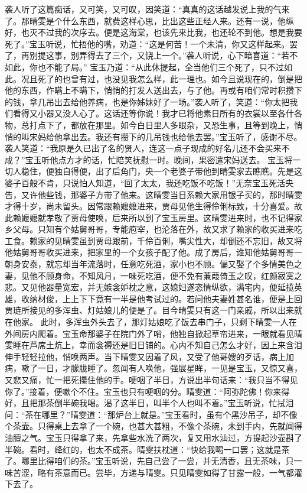 \documentclass[12pt,oneside]{book}
\begin{document}
袭人听了这篇痴话，又可笑，又可叹，因笑道：“真真的这话越发说上我的气来了。那晴雯是个什么东西，就费这样心思，比出这些正经人来。还有一说，他纵好，也灭不过我的次序去。便是这海棠，也该先来比我，也还轮不到他。想是我要死了。”宝玉听说，忙捂他的嘴，劝道：“这是何苦！一个未清，你又这样起来。罢了，再别提这事，别弄得去了三个，又饶上一个。”袭人听说，心下暗喜道：“若不如此，你也不能了局。”
宝玉乃道：“从此休提起，全当他们三个死了，只不过如此。况且死了的也曾有过，也没见我怎么样，此一理也。如今且说现在的，倒是把他的东西，作瞒上不瞒下，悄悄的打发人送出去，与了他。再或有咱们常时积攒下的钱，拿几吊出去给他养病，也是你姊妹好了一场。”袭人听了，笑道：“你太把我们看得又小器又没人心了。这话还等你说！我才已将他素日所有的衣裳以至各什各物，总打点下了，都放在那里。如今白日里人多眼杂，又恐生事，且等到晚上，悄悄的叫宋妈给他拿出去。我还有攒下的几吊钱也给他去罢。”宝玉听了，感谢不尽。袭人笑道：“我原是久已出了名的贤人，连这一点子现成的好名儿还不会买来不成？”宝玉听他点方才的话，忙陪笑抚慰一时。晚间，果密遣宋妈送去。
宝玉将一切人稳住，便独自得便，出了后角门，央一个老婆子带他到晴雯家去瞧瞧。先是这婆子百般不肯，只说怕人知道，“回了太太，我还吃饭不吃饭！”无奈宝玉死活央告，又许他些钱，那婆子方带了他来。这晴雯当日系赖大家用银子买的，那时晴雯才得十岁，尚未留头。因常跟赖嬷嬷进来，贾母见他生得伶俐标致，十分喜爱。故此赖嬷嬷就孝敬了贾母使唤，后来所以到了宝玉房里。这晴雯进来时，也不记得家乡父母。只知有个姑舅哥哥，专能庖宰，也沦落在外，故又求了赖家的收买进来吃工食。赖家的见晴雯虽到贾母跟前，千伶百俐，嘴尖性大，却倒还不忘旧，故又将他姑舅哥哥收买进来，把家里的一个女孩子配了他。成了房后，谁知他姑舅哥哥一朝身安泰，就忘却当年流落时，任意吃死酒，家小也不顾。偏又娶了个多情美色之妻，见他不顾身命，不知风月，一味死吃酒，便不免有蒹葭倚玉之叹，红颜寂寞之悲。又见他器量宽宏，并无嫉衾妒枕之意，这媳妇遂恣情纵欲，满宅内，便延揽英雄，收纳材俊，上上下下竟有一半是他考试过的。若问他夫妻姓甚名谁，便是上回贾琏所接见的多浑虫、灯姑娘儿的便是了。目今晴雯只有这一门亲戚，所以出来就在他家。
此时，多浑虫外头去了，那灯姑娘吃了饭去串门子，只剩下晴雯一人在外间房内爬着。宝玉命那婆子在院门外了哨，他独自掀起草帘进来，一眼就看见晴雯睡在芦席土炕上，幸而衾褥还是旧日铺的。心内不知自己怎么才好，因上来含泪伸手轻轻拉他，悄唤两声。当下晴雯又因着了风，又受了他哥嫂的歹话，病上加病，嗽了一日，才朦胧睡了。忽闻有人唤他，强展星眸，一见是宝玉，又惊又喜，又悲又痛，忙一把死攥住他的手。哽咽了半日，方说出半句话来：“我只当不得见你了。”接着，便嗽个不住。宝玉也只有哽咽的分。晴雯道：“阿弥陀佛！你来得好，且把那茶倒半碗我喝。渴了这半日，叫半个人也叫不着。”宝玉听说，忙拭泪问：“茶在哪里？”晴雯道：“那炉台上就是。”宝玉看时，虽有个黑沙吊子，却不像个茶壶。只得桌上去拿了一个碗，也甚大甚粗，不像个茶碗，未到手内，先就闻得油膻之气。宝玉只得拿了来，先拿些水洗了两次，复又用水汕过，方提起沙壶斟了半碗。看时，绛红的，也太不成茶。晴雯扶枕道：“快给我喝一口罢；这就是茶了。哪里比得咱们的茶。”宝玉听说，先自己尝了一尝，并无清香，且无茶味，只一味苦涩，略有茶意而已。尝毕，方递与晴雯。只见晴雯如得了甘露一般，一气都灌下去了。
\end{document}
